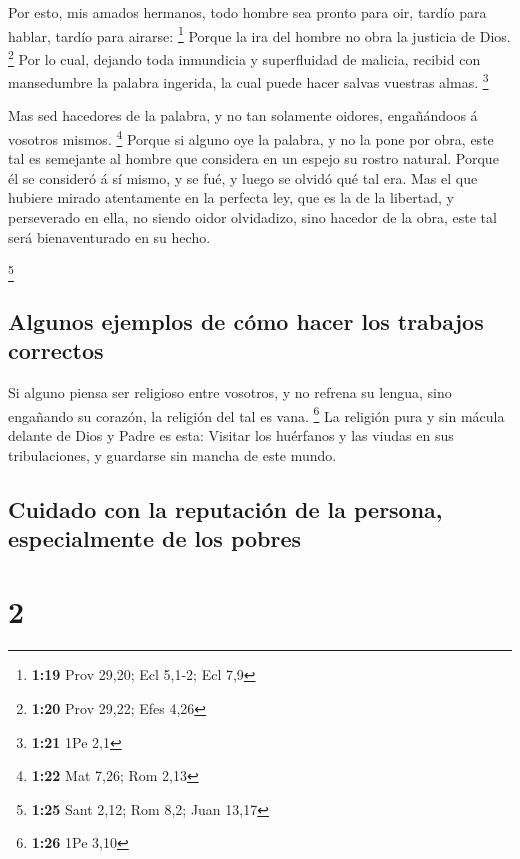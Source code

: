  Por esto, mis amados hermanos, todo hombre sea pronto
para oir, tardío para hablar, tardío para airarse: \footnote{\textbf{1:19}
  Prov 29,20; Ecl 5,1-2; Ecl 7,9}  Porque la ira del
hombre no obra la justicia de Dios. \footnote{\textbf{1:20} Prov 29,22;
  Efes 4,26}  Por lo cual, dejando toda inmundicia y
superfluidad de malicia, recibid con mansedumbre la palabra ingerida, la
cual puede hacer salvas vuestras almas. \footnote{\textbf{1:21} 1Pe 2,1}

 Mas sed hacedores de la palabra, y no tan solamente
oidores, engañándoos á vosotros mismos. \footnote{\textbf{1:22} Mat
  7,26; Rom 2,13}  Porque si alguno oye la palabra, y no
la pone por obra, este tal es semejante al hombre que considera en un
espejo su rostro natural.  Porque él se consideró á sí
mismo, y se fué, y luego se olvidó qué tal era.  Mas el
que hubiere mirado atentamente en la perfecta ley, que es la de la
libertad, y perseverado en ella, no siendo oidor olvidadizo, sino
hacedor de la obra, este tal será bienaventurado en su hecho.

\footnote{\textbf{1:25} Sant 2,12; Rom 8,2; Juan 13,17}

\hypertarget{algunos-ejemplos-de-cuxf3mo-hacer-los-trabajos-correctos}{%
\subsection{Algunos ejemplos de cómo hacer los trabajos
correctos}\label{algunos-ejemplos-de-cuxf3mo-hacer-los-trabajos-correctos}}

 Si alguno piensa ser religioso entre vosotros, y no
refrena su lengua, sino engañando su corazón, la religión del tal es
vana. \footnote{\textbf{1:26} 1Pe 3,10}  La religión pura
y sin mácula delante de Dios y Padre es esta: Visitar los huérfanos y
las viudas en sus tribulaciones, y guardarse sin mancha de este mundo.

\hypertarget{cuidado-con-la-reputaciuxf3n-de-la-persona-especialmente-de-los-pobres}{%
\subsection{Cuidado con la reputación de la persona, especialmente de
los
pobres}\label{cuidado-con-la-reputaciuxf3n-de-la-persona-especialmente-de-los-pobres}}

\hypertarget{section-1}{%
\section{2}\label{section-1}}

